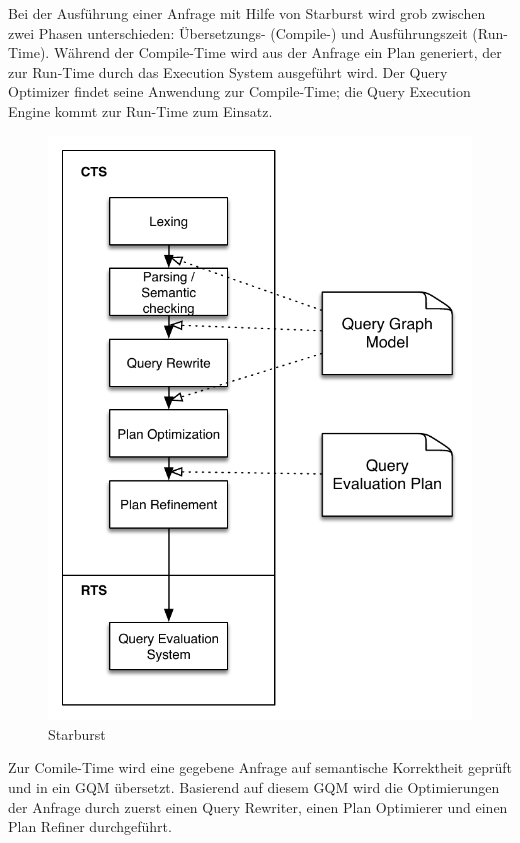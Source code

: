 Bei der Ausführung einer Anfrage mit Hilfe von Starburst wird grob zwischen zwei Phasen unterschieden: Übersetzungs- (Compile-) und Ausführungszeit (Run-Time). Während der Compile-Time wird aus der Anfrage ein Plan generiert, der zur Run-Time durch das Execution System ausgeführt wird. Der Query Optimizer findet seine Anwendung zur Compile-Time; die Query Execution Engine kommt zur Run-Time zum Einsatz.

\begin{figure}[h]
  \centering
  \includegraphics{03_Related_Work/StarburstFlow.pdf}
  \caption{Starburst}
\end{figure}

Zur Comile-Time wird eine gegebene Anfrage auf semantische Korrektheit geprüft und in ein \ac{GQM} übersetzt. Basierend auf diesem \ac{GQM} wird die Optimierungen der Anfrage durch zuerst einen Query Rewriter, einen Plan Optimierer und einen Plan Refiner durchgeführt.

